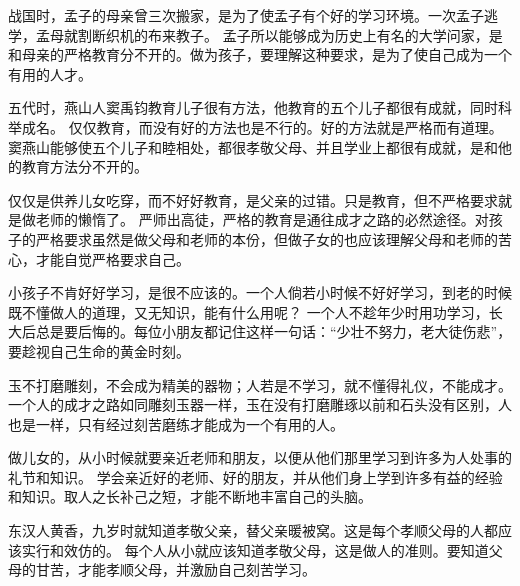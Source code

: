 \documentclass[avery5371,grid]{flashcards}
\begin{document}
{战国时，孟子的母亲曾三次搬家，是为了使孟子有个好的学习环境。一次孟子逃学，孟母就割断织机的布来教子。} %
{孟子所以能够成为历史上有名的大学问家，是和母亲的严格教育分不开的。做为孩子，要理解这种要求，是为了使自己成为一个有用的人才。} %

{五代时，燕山人窦禹钧教育儿子很有方法，他教育的五个儿子都很有成就，同时科举成名。} %
{仅仅教育，而没有好的方法也是不行的。好的方法就是严格而有道理。窦燕山能够使五个儿子和睦相处，都很孝敬父母、并且学业上都很有成就，是和他的教育方法分不开的。} %

{仅仅是供养儿女吃穿，而不好好教育，是父亲的过错。只是教育，但不严格要求就是做老师的懒惰了。} %
{严师出高徒，严格的教育是通往成才之路的必然途径。对孩子的严格要求虽然是做父母和老师的本份，但做子女的也应该理解父母和老师的苦心，才能自觉严格要求自己。} %

{小孩子不肯好好学习，是很不应该的。一个人倘若小时候不好好学习，到老的时候既不懂做人的道理，又无知识，能有什么用呢？} %
{一个人不趁年少时用功学习，长大后总是要后悔的。每位小朋友都记住这样一句话：“少壮不努力，老大徒伤悲”，要趁视自己生命的黄金时刻。} %

{玉不打磨雕刻，不会成为精美的器物；人若是不学习，就不懂得礼仪，不能成才。} %
{一个人的成才之路如同雕刻玉器一样，玉在没有打磨雕琢以前和石头没有区别，人也是一样，只有经过刻苦磨练才能成为一个有用的人。} %

{做儿女的，从小时候就要亲近老师和朋友，以便从他们那里学习到许多为人处事的礼节和知识。} %
{学会亲近好的老师、好的朋友，并从他们身上学到许多有益的经验和知识。取人之长补己之短，才能不断地丰富自己的头脑。} %

{东汉人黄香，九岁时就知道孝敬父亲，替父亲暖被窝。这是每个孝顺父母的人都应该实行和效仿的。} %
{每个人从小就应该知道孝敬父母，这是做人的准则。要知道父母的甘苦，才能孝顺父母，并激励自己刻苦学习。} %
\end{document}
